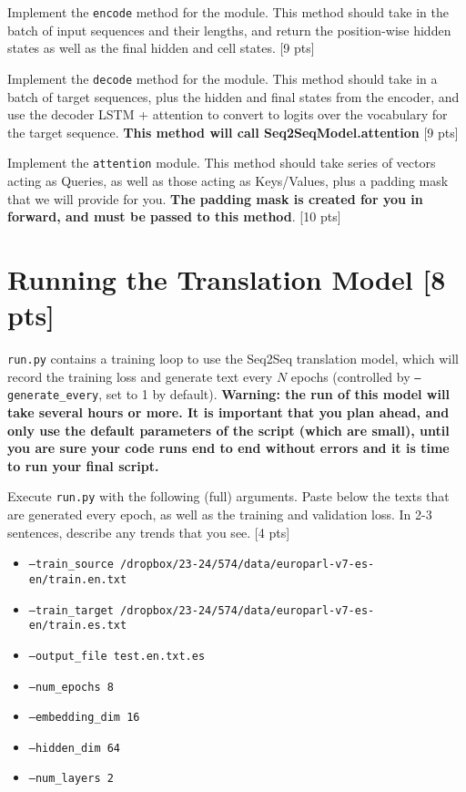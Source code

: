 \documentclass[11pt]{article}
\begin{document}
\vspace{2em}
 Implement the \texttt{encode} method for the module. This method should take in the batch of input sequences and their lengths, and return the position-wise hidden states as well as the final hidden and cell states. \hfill [9 pts]

\vspace{2em}
 Implement the \texttt{decode} method for the module. This method should take in a batch of target sequences, plus the hidden and final states from the encoder, and use the decoder LSTM + attention to convert to logits over the vocabulary for the target sequence. \textbf{This method will call Seq2SeqModel.attention} \hfill [9 pts]

\vspace{2em}
 Implement the \texttt{attention} module. This method should take series of vectors acting as Queries, as well as those acting as Keys/Values, plus a padding mask that we will provide for you. \textbf{The padding mask is created for you in forward, and must be passed to this method}. \hfill [10 pts]

\section{Running the Translation Model [8 pts]}

\texttt{run.py} contains a training loop to use the Seq2Seq translation model, which will record the training loss and generate text every $N$ epochs (controlled by \texttt{--generate\_every}, set to 1 by default). \textbf{Warning: the run of this model will take several hours or more. It is important that you plan ahead, and only use the default parameters of the script (which are small), until you are sure your code runs end to end without errors and it is time to run your final script.}

\vspace{2em}
  Execute \texttt{run.py} with the following (full) arguments. Paste below the texts that are generated every epoch, as well as the training and validation loss.  In 2-3 sentences, describe any trends that you see. \hfill [4 pts]
\begin{itemize}
    \item \texttt{--train\_source /dropbox/23-24/574/data/europarl-v7-es-en/train.en.txt}
    \item \texttt{--train\_target /dropbox/23-24/574/data/europarl-v7-es-en/train.es.txt}
    \item \texttt{--output\_file test.en.txt.es}
    \item \texttt{--num\_epochs 8}
    \item \texttt{--embedding\_dim 16}
    \item \texttt{--hidden\_dim 64}
    \item \texttt{--num\_layers 2}
\end{itemize}
\end{document}
